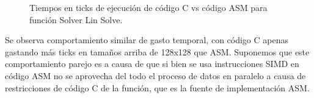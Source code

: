 \begin{figure}[htbp]
\centering


\caption{Tiempos en ticks de ejecución de código C vs código ASM para función Solver Lin Solve.} \label{fig:lego}
\end{figure}

Se observa comportamiento similar de gasto temporal, con código C apenas gastando más ticks en tamaños arriba de 128x128 que ASM.
Suponemos que este comportamiento parejo es a causa de que si bien se usa instrucciones SIMD en código ASM no se aprovecha del todo el proceso de datos en paralelo a causa de restricciones de código C de la función, que es la fuente de implementación ASM.


